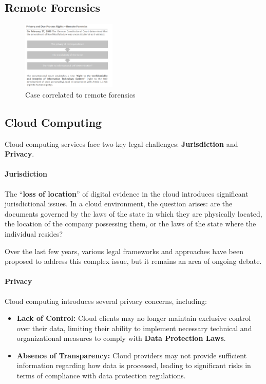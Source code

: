 
\subsection{Remote Forensics}

\begin{figure}[h!]
  \centering
  \includegraphics[width=0.4\textwidth]{img/remote_case.png}
  \caption{Case correlated to remote forensics}
  \label{fig:remote process}
\end{figure}

\subsection{Cloud Computing}

Cloud computing services face two key legal challenges: \textbf{Jurisdiction} and \textbf{Privacy}.

\paragraph{Jurisdiction}
The “\textbf{loss of location}” of digital evidence in the cloud introduces significant jurisdictional issues. In a cloud environment, the question arises: are the documents governed by the laws of the state in which they are physically located, the location of the company possessing them, or the laws of the state where the individual resides?

Over the last few years, various legal frameworks and approaches have been proposed to address this complex issue, but it remains an area of ongoing debate.

\paragraph{Privacy}
Cloud computing introduces several privacy concerns, including:
\begin{itemize}
  \item \textbf{Lack of Control:} Cloud clients may no longer maintain exclusive control over their data, limiting their ability to implement necessary technical and organizational measures to comply with \textbf{Data Protection Laws}.
  \item \textbf{Absence of Transparency:} Cloud providers may not provide sufficient information regarding how data is processed, leading to significant risks in terms of compliance with data protection regulations.
\end{itemize}

